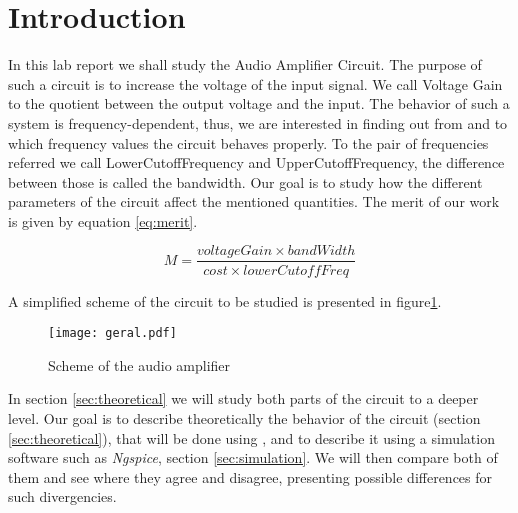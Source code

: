 \section{Introduction}
\label{sec:introduction}

\par In this lab report we shall study the Audio Amplifier Circuit. The purpose of such a circuit is to increase the voltage of the input signal. We call Voltage Gain to the quotient between the output voltage and the input. The behavior of such a system is frequency-dependent, thus, we are interested in finding out from and to which frequency values the circuit behaves properly. To the pair of frequencies referred we call LowerCutoffFrequency and UpperCutoffFrequency, the difference between those is called the bandwidth. Our goal is to study how the different parameters of the circuit affect the mentioned quantities. The merit of our work is given by equation \ref{eq:merit}.



\begin{equation}
    M = \frac{voltageGain \times bandWidth}{cost \times lowerCutoffFreq}
    \label{eq:merit}
\end{equation}



A simplified scheme of the circuit to be studied is presented in figure\ref{fig:circuit}. 

 \begin{figure}[H]   
 \centering
 \texttt{[image: geral.pdf]}
 \caption{Scheme of the audio amplifier}
 \label{fig:circuit}
 \end{figure}

In section \ref{sec:theoretical} we will study both parts of the circuit to a deeper level. Our goal is to describe theoretically the behavior of the circuit (section \ref{sec:theoretical}), that will be done using , and to describe it using a simulation software such as \emph{Ngspice}, section \ref{sec:simulation}. We will then compare both of them and see where they agree and disagree, presenting possible differences for such divergencies.